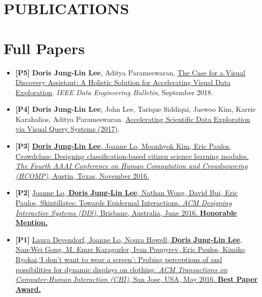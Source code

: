 \documentclass{res}
\begin{document}
\begin{resume}
\section{PUBLICATIONS}
\vspace{-5pt}
\section{Full Papers}
\begin{itemize}[leftmargin=0in,label={}]
\item \textbf{[P5]} \textbf{Doris Jung-Lin Lee}, Aditya Parameswaran, \href{}{The Case for a Visual Discovery Assistant: A Holistic Solution for Accelerating Visual Data Exploration}. \textit{IEEE Data Engineering Bulletin}, September 2018.
\item \textbf{[P4]} \textbf{Doris Jung-Lin Lee}, John Lee, Tarique Siddiqui, Jaewoo Kim, Karrie Karahalios, Aditya Parameswaran. \href{https://arxiv.org/abs/1710.00763}{Accelerating Scientific Data Exploration via Visual Query Systems (2017)}. 
\item \textbf{[P3]} \href{http://aaai.org/ocs/index.php/HCOMP/HCOMP16/paper/viewFile/14027/13638}{\textbf{Doris Jung-Lin Lee}, Joanne Lo, Moonhyok Kim, Eric Paulos, Crowdclass: Designing classification-based citizen science learning modules. \textit{The Fourth AAAI Conference on Human Computation and Crowdsourcing (HCOMP)}, Austin, Texas, November 2016.}
\item \textbf{[P2]} \href{http://dl.acm.org/citation.cfm?id=2901885&CFID=765226474&CFTOKEN=46922780}{Joanne Lo, \textbf{Doris Jung-Lin Lee}, Nathan Wong, David Bui, Eric Paulos, Skintillates: Towards Epidermal Interactions.  \textit{ACM Designing Interactive Systems (DIS)}, Brisbane, Australia, June 2016. \textbf{Honorable Mention.}}
\item \textbf{[P1]} \href{http://dl.acm.org/citation.cfm?id=2858192&CFID=765226474&CFTOKEN=46922780}{Laura Devendorf, Joanne Lo, Noura Howell, \textbf{Doris Jung-Lin Lee}, Nan-Wei Gong, M. Emre Karagozler, Ivan  Poupyrev, Eric Paulos, Kimiko Ryokai,\hspace{1pt}`I don't want to wear a screen': Probing perceptions of and  possibilities for dynamic displays on clothing. \textit{ACM Transactions on Computer-Human Interaction (CHI)}, San Jose, USA, May 2016. \textbf{Best Paper Award.}}
\end{itemize}
\vspace{-10pt}

\end{resume}
\end{document}
